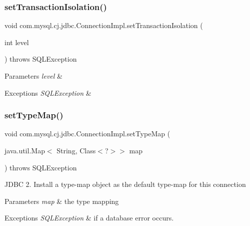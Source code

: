 \subsubsection{\texorpdfstring{set\+Transaction\+Isolation()}{setTransactionIsolation()}}
{\footnotesize\ttfamily void com.\+mysql.\+cj.\+jdbc.\+Connection\+Impl.\+set\+Transaction\+Isolation (\begin{DoxyParamCaption}\item[{int}]{level }\end{DoxyParamCaption}) throws S\+Q\+L\+Exception}


\begin{DoxyParams}{Parameters}
{\em level} & \\
\hline
\end{DoxyParams}

\begin{DoxyExceptions}{Exceptions}
{\em S\+Q\+L\+Exception} & \\
\hline
\end{DoxyExceptions}
\mbox{\label{classcom_1_1mysql_1_1cj_1_1jdbc_1_1_connection_impl_a8cad56f950d2e2faa07c1d8e46116475}} 
\subsubsection{\texorpdfstring{set\+Type\+Map()}{setTypeMap()}}
{\footnotesize\ttfamily void com.\+mysql.\+cj.\+jdbc.\+Connection\+Impl.\+set\+Type\+Map (\begin{DoxyParamCaption}\item[{java.\+util.\+Map$<$ String, Class$<$?$>$$>$}]{map }\end{DoxyParamCaption}) throws S\+Q\+L\+Exception}

J\+D\+BC 2. Install a type-\/map object as the default type-\/map for this connection


\begin{DoxyParams}{Parameters}
{\em map} & the type mapping \\
\hline
\end{DoxyParams}

\begin{DoxyExceptions}{Exceptions}
{\em S\+Q\+L\+Exception} & if a database error occurs. \\
\hline
\end{DoxyExceptions}
\mbox{\label{classcom_1_1mysql_1_1cj_1_1jdbc_1_1_connection_impl_ad33978512e58f5bb84875219ffd8af41}} 
